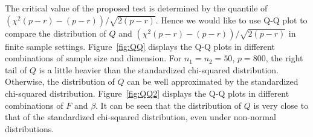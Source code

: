 \documentclass[times,sort&compress,3p]{elsarticle}
\theoremstyle{plain}
\theoremstyle{definition}
\theoremstyle{remark}
\begin{document}
The critical value of the proposed test is determined by the quantile of $(\chi^2(p-r)-(p-r))/\sqrt{2(p-r)}$.
Hence we would like to use Q-Q plot to compare the distribution of $Q$ and $(\chi^2(p-r)-(p-r))/\sqrt{2(p-r)}$ in finite sample settings.
Figure~\ref{fig:QQ} displays the Q-Q plots in different combinations of sample size and dimension.
For $n_1=n_2=50$, $p=800$, the right tail of $Q$ is a little heavier than the standardized chi-squared distribution.
Otherwise, the distribution of $Q$ can be well approximated by the standardized chi-squared distribution.
Figure~\ref{fig:QQ2} displays the Q-Q plots in different combinations of $F$ and $\beta$.
It can be seen that the distribution of $Q$ is very close to that of the standardized chi-squared distribution, even under non-normal distributions.
\end{document}
